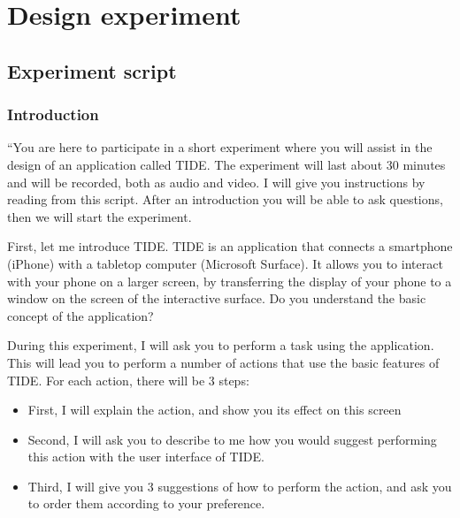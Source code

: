 
\chapter{Design experiment}

\tightlists

\section{Experiment script}
\label{app:study}

\subsection{Introduction}
``You are here to participate in a short experiment where you will assist in the design of an application called TIDE.
The experiment will last about 30 minutes and will be recorded, both as audio and video.
I will give you instructions by reading from this script.
After an introduction you will be able to ask questions, then we will start the experiment.

First, let me introduce TIDE.
TIDE is an application that connects a smartphone (iPhone) with a tabletop computer (Microsoft Surface).
It allows you to interact with your phone on a larger screen, by transferring the display of your phone to a window on the screen of the interactive surface.
Do you understand the basic concept of the application?

During this experiment, I will ask you to perform a task using the application.
This will lead you to perform a number of actions that use the basic features of TIDE.
For each action, there will be 3 steps:

\begin{itemize}
\item{First, I will explain the action, and show you its effect on this screen}
\item{Second, I will ask you to describe to me how you would suggest performing this action with the user interface of TIDE.}
\item{Third, I will give you 3 suggestions of how to perform the action, and ask you to order them according to your preference.}
\end{itemize}

